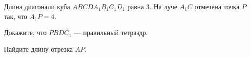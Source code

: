 \begin{ex}
	\begin{condition}
		Длина диагонали куба \( ABCDA_1B_1C_1D_1 \) равна \( 3 \). На луче \( A_1C \) отмечена точка \( P \) так, что \( A_1P = 4 \).
		\begin{enumcols}[label=\asbuk*)]
			\item Докажите, что \( PBDC_1 \) — правильный тетраэдр.
			\item Найдите длину отрезка \( AP \).
		\end{enumcols}
	\end{condition}
\end{ex}